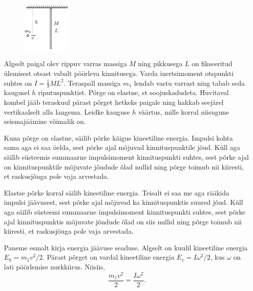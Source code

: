 
\begin{figure}
 \vspace{-20pt}
 \begin{center}
 \includegraphics[width=0.22\textwidth]{2015-v2g-06-porgejoonis}
 \end{center}
\end{figure}

Algselt paigal olev rippuv varras massiga $M$ ning pikkusega $L$ on fikseeritud ülemisest otsast vabalt pöörleva kinnitusega. Varda inertsimoment otspunkti suhtes on $I=\frac{1}{3}ML^2$. Teraspall massiga $m_1$ lendab vastu varrast ning tabab seda kaugusel $h$ riputuspunktist. Põrge on elastne, st soojuskadudeta. Huvitaval kombel jääb teraskuul pärast põrget hetkeks paigale ning hakkab seejärel vertikaalselt alla langema. Leidke kauguse $h$ väärtus, mille korral niisugune seismajäämine võimalik on.

\hint
Kuna põrge on elastne, säilib põrke käigus kineetiline energia. Impulsi kohta sama aga ei saa öelda, sest põrke ajal mõjuvad kinnituspunktile jõud. Küll aga säilib süsteemis summaarne impulsimoment kinnituspunkti suhtes, sest põrke ajal on kinnituspunktile mõjuvate jõudude õlad nullid ning põrge toimub nii kiiresti, et raskusjõuga pole vaja arvestada.

\solu
Elastse põrke korral säilib kineetiline energia. Teisalt ei saa me aga rääkida impulsi jäävusest, sest põrke ajal mõjuvad ka kinnituspunktis suured jõud. Küll aga säilib süsteemi summaarne impulsimoment kinnituspunkti suhtes, sest põrke ajal kinnituspunktis mõjuvate jõudude õlad on siis nullid ning põrge toimub nii kiiresti, et raskusjõuga pole vaja arvestada.

Paneme esmalt kirja energia jäävuse seaduse. Algselt on kuulil kineetiline energia $E_k=m_1v^2/2$. Pärast põrget on vardal kineetiline energia $E_v=I\omega^2/2$, kus $\omega$ on lati pöörlemise nurkkiirus. Niisiis,
\[
\frac{m_1v^2}{2}=\frac{I\omega^2}{2}.
\]

